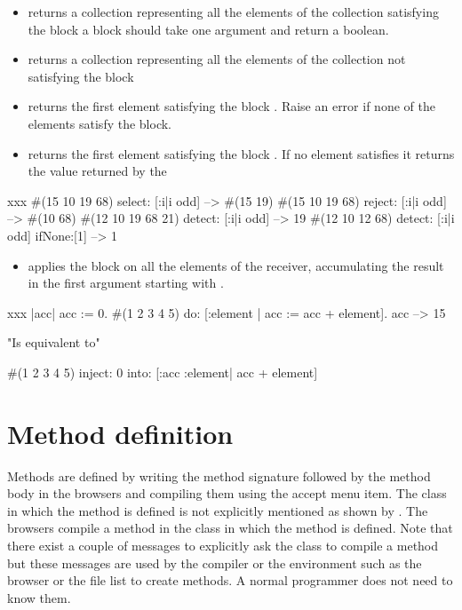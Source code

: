 \documentclass[a4paper,10pt,twoside]{book}
\begin{document}
\begin{itemize}
\item  {} returns a collection representing all the elements of the collection
satisfying the block  a block should take one argument and return a boolean.
\item  {} returns a collection representing all the elements of the collection
not satisfying the block 

\item  {} returns the first element satisfying  the block . Raise an error if none of the elements satisfy the block.
\item  {} returns the first element satisfying the block . If no element satisfies it  returns the value returned by the 
\end{itemize}

\begin{script}[xxx]{xxx}
#(15 10 19 68) select: [:i|i odd]
--> #(15 19)
#(15 10 19 68) reject: [:i|i odd]
--> #(10 68)
#(12 10 19 68 21) detect: [:i|i odd]
-->  19
#(12 10 12 68) detect: [:i|i odd] ifNone:[1]
--> 1
\end{script}


\begin{itemize}
\item {} applies the block  on all the elements of the receiver, accumulating the result in the first argument starting with .
\end{itemize}


\begin{script}[xxx]{xxx}
|acc|
acc := 0.
#(1 2 3 4 5) do: [:element | acc := acc + element].
acc
-->  15

"Is equivalent to"

#(1 2 3 4 5)
   inject: 0
   into: [:acc :element| acc + element]
\end{script}


\section{Method definition}
Methods are defined by writing the method signature followed by the method body in the browsers and compiling them using the accept menu item. The class in which the method is defined is not explicitly mentioned as shown by .
The browsers compile a method in the class in which the method is defined. Note that there exist a couple of messages to explicitly ask the class to compile a method but these messages are used by the compiler or the environment such as the browser or the file list to create methods. A normal programmer does not need to know them.
\end{document}
